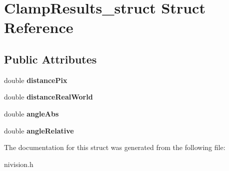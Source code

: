 \hypertarget{structClampResults__struct}{
\section{ClampResults\_\-struct Struct Reference}
\label{structClampResults__struct}
}
\subsection*{Public Attributes}
\begin{DoxyCompactItemize}
\item 
\hypertarget{structClampResults__struct_a5d663d5e348fbb6120c0f798feb11523}{
double {\bfseries distancePix}}
\label{structClampResults__struct_a5d663d5e348fbb6120c0f798feb11523}

\item 
\hypertarget{structClampResults__struct_a77c6e5962770b7580cabbb5c1a035dad}{
double {\bfseries distanceRealWorld}}
\label{structClampResults__struct_a77c6e5962770b7580cabbb5c1a035dad}

\item 
\hypertarget{structClampResults__struct_a89a7ce397834f31e41153bff9ce99baf}{
double {\bfseries angleAbs}}
\label{structClampResults__struct_a89a7ce397834f31e41153bff9ce99baf}

\item 
\hypertarget{structClampResults__struct_a6066b0a8aa6401596d2bf5255225bf8d}{
double {\bfseries angleRelative}}
\label{structClampResults__struct_a6066b0a8aa6401596d2bf5255225bf8d}

\end{DoxyCompactItemize}


The documentation for this struct was generated from the following file:\begin{DoxyCompactItemize}
\item 
nivision.h\end{DoxyCompactItemize}
